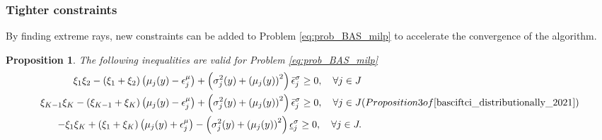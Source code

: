 \documentclass[12pt, letterpaper]{article}
\newtheorem{proposition}{Proposition}
\begin{document}
	\subsubsection{Tighter constraints}
	By finding extreme rays, new constraints can be added to Problem \eqref{eq:prob_BAS_milp} to accelerate the convergence of the algorithm.
	
	\begin{proposition} \label{prop:valid_inequalities}
		The following inequalities are valid for Problem \eqref{eq:prob_BAS_milp}
		\begin{subequations}
			\begin{align}
				\xi_{1} \xi_{2}-\left(\xi_{1}+\xi_{2}\right)\left(\mu_j(y)-\epsilon_j^\mu\right)+\left(\sigma_j^2(y)+\left(\mu_j(y)\right)^2\right) \bar{\epsilon}_j^\sigma \geq 0, \quad \forall j \in J \\
				\xi_{K-1} \xi_{K}-\left(\xi_{K-1}+\xi_{K}\right)\left(\mu_j(y)-\epsilon_j^\mu\right)+\left(\sigma_j^2(y)+\left(\mu_j(y)\right)^2\right) \bar{\epsilon}_j^\sigma \geq 0, \quad \forall j \in J \\
				-\xi_{1} \xi_{K}+\left(\xi_{1}+\xi_{K}\right)\left(\mu_j(y)+\epsilon_j^\mu\right)-\left(\sigma_j^2(y)+\left(\mu_j(y)\right)^2\right) \underline{\epsilon}_j^\sigma \geq 0, \quad \forall j \in J.
			\end{align}
			(Proposition 3 of \cite{basciftci_distributionally_2021})
		\end{subequations}
	\end{proposition}
	
\end{document}
